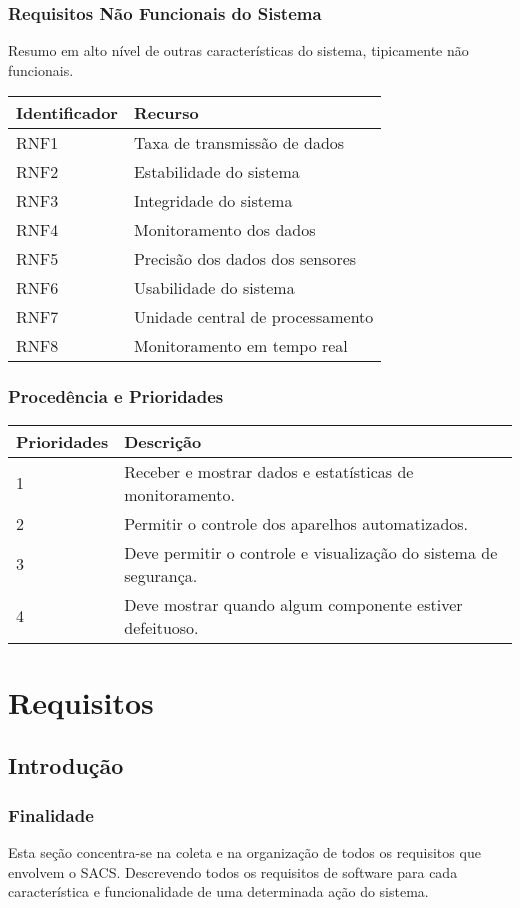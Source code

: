 \subsubsection{Requisitos Não Funcionais do Sistema}

	Resumo em alto nível de outras características do sistema, tipicamente não funcionais.

\begin{tabular}{|l|l|}
	\hline
	\textbf{Identificador} & \textbf{Recurso}\tabularnewline
	\hline
	\hline
	RNF1 & Taxa de transmissão de dados\tabularnewline
	\hline
	RNF2 & Estabilidade do sistema\tabularnewline
	\hline
	RNF3 & Integridade do sistema\tabularnewline
	\hline
	RNF4 & Monitoramento dos dados\tabularnewline
	\hline
	RNF5 & Precisão dos dados dos sensores\tabularnewline
	\hline
	RNF6 & Usabilidade do sistema\tabularnewline
	\hline
	RNF7 & Unidade central de processamento\tabularnewline
	\hline
	RNF8 & Monitoramento em tempo real\tabularnewline
	\hline
\end{tabular}

\subsubsection{Procedência e Prioridades}

\begin{tabular}{|l|l|}
	\hline
	\textbf{Prioridades} & \textbf{Descrição}\tabularnewline
	\hline
	\hline
	1 & Receber e mostrar dados e estatísticas de monitoramento. \tabularnewline
	\hline
	2 & Permitir o controle dos aparelhos automatizados. \tabularnewline
	\hline
	3 & Deve permitir o controle e visualização do sistema de segurança. \tabularnewline
	\hline
	4 & Deve mostrar quando algum componente estiver defeituoso. \tabularnewline
	\hline
\end{tabular}

\section{Requisitos}
\label{sec:requisitos}

\subsection{Introdução}
\subsubsection{Finalidade}
	Esta seção concentra-se na coleta e na organização de todos os requisitos que envolvem o SACS. Descrevendo todos
	os requisitos de software para cada característica e funcionalidade de uma determinada ação do sistema.


